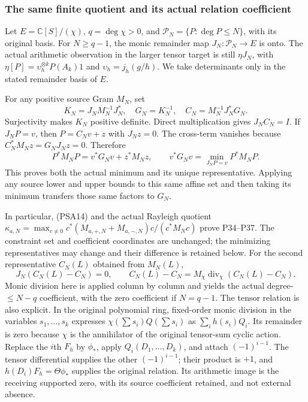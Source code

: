 \subsubsection{The same finite quotient and its actual relation coefficient}

Let $E=\mathbb C[S]/(\chi)$, $q=\deg\chi>0$, and
$\mathcal P_N=\{P:\deg P\le N\}$, with its original basis.
For $N\ge q-1$, the monic remainder map $J_N:\mathcal P_N\to E$
is onto. The actual arithmetic observation in the larger tensor target
is still $\eta J_N$, with
$\eta[P]=\upsilon_h^{\otimes k}P(A_k)1$ and
$\upsilon_h=j_h(g/h)$. We take determinants only in the stated
remainder basis of $E$.

For any positive source Gram $M_N$, set
\[
 K_N=J_NM_N^{-1}J_N^*,\quad G_N=K_N^{-1},\quad
 C_N=M_N^{-1}J_N^*G_N.
 \tag{PSA17}
\]
Surjectivity makes $K_N$ positive definite. Direct multiplication
gives $J_NC_N=I$. If $J_NP=v$, then $P=C_Nv+z$ with $J_Nz=0$.
The cross-term vanishes because
$C_N^*M_Nz=G_NJ_Nz=0$. Therefore
\[
 P^*M_NP=v^*G_Nv+z^*M_Nz,
 \qquad v^*G_Nv=\min_{J_NP=v}P^*M_NP.
 \tag{PSA18}
\]
This proves both the actual minimum and its unique representative.
Applying any source lower and upper bounds to this same affine set
and then taking its minimum transfers those same factors to $G_N$.

In particular, (PSA14) and the actual Rayleigh quotient
$\kappa_{a,N}=\max_{c\ne0}
c^*(M_{a,+,N}+M_{a,-,N})c/(c^*M_Nc)$ prove P34--P37.
The constraint set and coefficient coordinates are unchanged; the
minimizing representatives may change and their difference is retained
below. For the second representative
$C_N(L)$ obtained from $M_N(L)$,
\[
 J_N(C_N(L)-C_N)=0,\qquad
 C_N(L)-C_N=M_\chi\operatorname{div}_\chi(C_N(L)-C_N).
 \tag{PSA19}
\]
Monic division here is applied column by column and yields the actual
degree-$\le N-q$ coefficient, with the zero coefficient if $N=q-1$.
The tensor relation is also explicit. In the original polynomial
ring, fixed-order monic division in the variables $s_1,\ldots,s_k$
expresses $\chi(\sum s_i)Q(\sum s_i)$ as $\sum_i h(s_i)Q_i$.
Its remainder is zero because $\chi$ is the annihilator of the
original tensor-sum cyclic action. Replace the $i$th $F_h$ by
$\phi_*$, apply $Q_i(D_1,\ldots,D_k)$, and attach
$(-1)^{i-1}$. The tensor differential supplies the other
$(-1)^{i-1}$; their product is $+1$, and
$h(D_i)F_h=\Theta\phi_*$ supplies the original relation. Its
arithmetic image is the receiving supported zero, with its source
coefficient retained, and not external absence.

